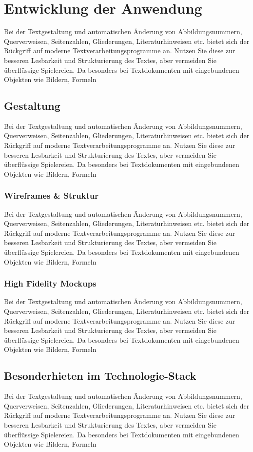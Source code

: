 \chapter{Entwicklung der Anwendung}
\thispagestyle{fancy}
Bei der Textgestaltung und automatischen Änderung von Abbildungsnummern, Querverweisen,
Seitenzahlen, Gliederungen, Literaturhinweisen etc. bietet sich der Rückgriff
auf moderne Textverarbeitungsprogramme an. Nutzen Sie diese zur besseren Lesbarkeit
und Strukturierung des Textes, aber vermeiden Sie überflüssige Spielereien. Da
besonders bei Textdokumenten mit eingebundenen Objekten wie Bildern, Formeln

\section{Gestaltung}
Bei der Textgestaltung und automatischen Änderung von Abbildungsnummern, Querverweisen,
Seitenzahlen, Gliederungen, Literaturhinweisen etc. bietet sich der Rückgriff
auf moderne Textverarbeitungsprogramme an. Nutzen Sie diese zur besseren Lesbarkeit
und Strukturierung des Textes, aber vermeiden Sie überflüssige Spielereien. Da
besonders bei Textdokumenten mit eingebundenen Objekten wie Bildern, Formeln

\subsection{Wireframes \& Struktur}
Bei der Textgestaltung und automatischen Änderung von Abbildungsnummern, Querverweisen,
Seitenzahlen, Gliederungen, Literaturhinweisen etc. bietet sich der Rückgriff
auf moderne Textverarbeitungsprogramme an. Nutzen Sie diese zur besseren Lesbarkeit
und Strukturierung des Textes, aber vermeiden Sie überflüssige Spielereien. Da
besonders bei Textdokumenten mit eingebundenen Objekten wie Bildern, Formeln

\subsection{High Fidelity Mockups}
Bei der Textgestaltung und automatischen Änderung von Abbildungsnummern, Querverweisen,
Seitenzahlen, Gliederungen, Literaturhinweisen etc. bietet sich der Rückgriff
auf moderne Textverarbeitungsprogramme an. Nutzen Sie diese zur besseren Lesbarkeit
und Strukturierung des Textes, aber vermeiden Sie überflüssige Spielereien. Da
besonders bei Textdokumenten mit eingebundenen Objekten wie Bildern, Formeln

\section{Besonderhieten im Technologie-Stack}
Bei der Textgestaltung und automatischen Änderung von Abbildungsnummern, Querverweisen,
Seitenzahlen, Gliederungen, Literaturhinweisen etc. bietet sich der Rückgriff
auf moderne Textverarbeitungsprogramme an. Nutzen Sie diese zur besseren Lesbarkeit
und Strukturierung des Textes, aber vermeiden Sie überflüssige Spielereien. Da
besonders bei Textdokumenten mit eingebundenen Objekten wie Bildern, Formeln

